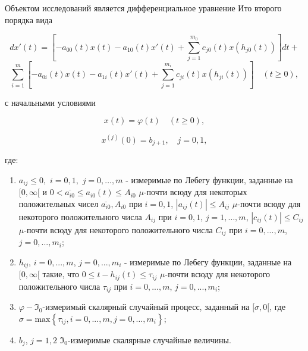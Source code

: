 Объектом исследований является дифференциальное уравнение Ито второго порядка вида

\begin{equation}\label{kri-eq-1}
	dx'(t) = \left[-a_{00}(t)x(t) - a_{10}(t)x'(t) + \sum_{j=1}^{m_0}c_{j0}(t)x(h_{j0}(t))\right]dt +
\end{equation}
\begin{equation*}
	\sum_{i=1}^{m} \left[-a_{0i}(t)x(t)-a_{1i}(t)x'(t)+\sum_{j=1}^{m_i}c_{ji}(t)x(h_{ji}(t))\right] \quad (t \ge 0),
\end{equation*}

с начальными условиями

\begin{equation}\label{kri-eq-1a}
	x(t)=\varphi (t)\quad(t\ge 0),
\end{equation}

\begin{equation}\label{kri-eq-1b}
	x^{(j)}(0)=b_{j+1}, \quad j=0,1,
\end{equation}

где:

\begin{enumerate}
	\item[1.]
	$a_{ij}\le 0,$ $i=0,1,$ $j=0,\dots,m$ - измеримые по Лебегу	функции, заданные на $[0,\infty [$ и  $0<\overline{a_{\mathit{i0}}}\le a_{\mathit{i0}}(t)\le A_{\mathit{i0}}$ $\mu$-почти всюду для некоторых положительных чисел $\overline{a_{\mathit{i0}}},A_{\mathit{i0}}$ при $i=0,1$, $|a_{ij}(t)|\le A_{ij}$ $\mu$-почти всюду для некоторого положительного числа  $A_{ij}$ при $i=0,1$, $j=1,\dots,m$, $|c_{ij}(t)|\le C_{ij}$ $\mu$-почти всюду для некоторого положительного числа  $C_{ij}$ при $i=0,...,m$, $j=0,...,m_i$;
	
	\item[2.]
	$h_{ij}$, $i=0,...,m$, $j=0,...,m_i$ - измеримые по Лебегу функции, заданные на $[0,\infty [$ такие, что $0 \le t-h_{ij}(t)\le \tau_{ij}$ $\mu$-почти всюду для некоторого положительного числа  $\tau_{ij}$ при $i=0,...,m$, $j=0,...,m_i$;
	
	\item[3.]
	$\varphi - \Im_0$-измеримый скалярный случайный процесс, заданный на $[\sigma ,0[$, где \linebreak $\sigma =\text{max}\left\{\tau_{ij}, i=0,...,m, j=0,\dots,m_i\right\}$;
	
	\item[4.]
	$b_j$, $j=1,2$ $\Im_0$-измеримые скалярные случайные величины.
\end{enumerate}

